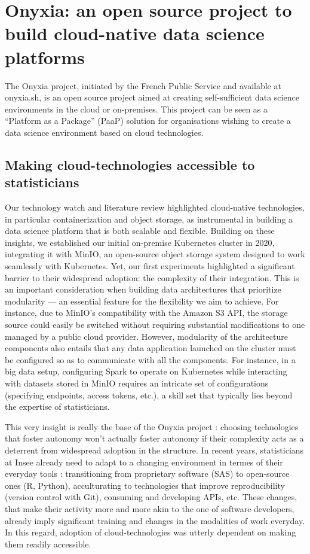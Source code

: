 \section{Onyxia: an open source project to build cloud-native data science platforms}

The Onyxia project, initiated by the French Public Service and available at
onyxia.sh, is an open source project aimed at creating self-sufficient data science environments in the cloud or on-premises. This project can be seen as a “Platform as a Package” (PaaP) solution for organisations wishing to create a data science environment based on cloud technologies.

\subsection{Making cloud-technologies accessible to statisticians}

Our technology watch and literature review highlighted cloud-native technologies, in particular containerization and object storage, as instrumental in building a data science platform that is both scalable and flexible. Building on these insights, we established our initial on-premise Kubernetes cluster in 2020, integrating it with MinIO, an open-source object storage system designed to work seamlessly with Kubernetes. Yet, our first experiments highlighted a significant barrier to their widespread adoption: the complexity of their integration. This is an important consideration when building data architectures that prioritize modularity — an essential feature for the flexibility we aim to achieve. For instance, due to MinIO's compatibility with the Amazon S3 API, the storage source could easily be switched without requiring substantial modifications to one managed by a public cloud provider. However, modularity of the architecture components also entails that any data application launched on the cluster must be configured so as to communicate with all the components. For instance, in a big data setup, configuring Spark to operate on Kubernetes while interacting with datasets stored in MinIO requires an intricate set of configurations (specifying endpoints, access tokens, etc.), a skill set that typically lies beyond the expertise of statisticians.

This very insight is really the base of the Onyxia project : choosing technologies that foster autonomy won't actually foster autonomy if their complexity acts as a deterrent from widespread adoption in the structure. In recent years, statisticians at Insee already need to adapt to a changing environment in termes of their everyday tools : transitioning from proprietary software (SAS) to open-source ones (R, Python), acculturating to technologies that improve reproducibility (version control with Git), consuming and developing APIs, etc. These changes, that make their activity more and more akin to the one of software developers, already imply significant training and changes in the modalities of work everyday. In this regard, adoption of cloud-technologies was utterly dependent on making them readily accessible.

